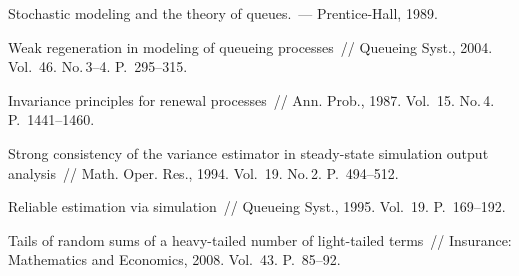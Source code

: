 \begin{multicols}{2}
{{\begin{thebibliography}{99}
   Stochastic modeling and the theory of queues.~---
Prentice-Hall, 1989.

 Weak regeneration in modeling of queueing processes~// 
Queueing  Syst., 2004.  Vol.~46. No.\,3--4. P.~295--315.

 Invariance
principles for renewal processes~//  Ann. Prob., 1987.
Vol.~15. No.\,4. P.~1441--1460.

 Strong consistency of the variance estimator in
steady-state simulation output analysis~// Math. Oper.
Res., 1994. Vol.~19. No.\,2. P.~494--512.

 Reliable estimation via simulation~// Queueing
Syst., 1995. Vol.~19. P.~169--192.


\label{end\stat}


   Tails of random sums of a
heavy-tailed number of light-tailed terms~// Insurance: Mathematics
and Economics, 2008. Vol.~43. P.~85--92.
\end{thebibliography}
}
}

\end{multicols}